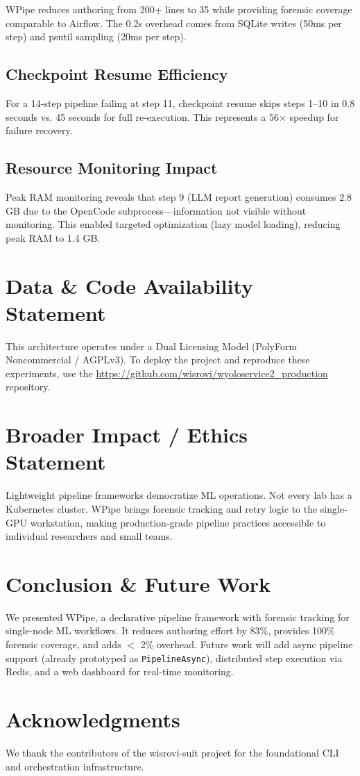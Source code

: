 \documentclass[10pt,twocolumn,letterpaper]{article}
\begin{document}
WPipe reduces authoring from 200+ lines to 35 while providing forensic coverage comparable to Airflow. The 0.2s overhead comes from SQLite writes (50ms per step) and psutil sampling (20ms per step).

\subsection{Checkpoint Resume Efficiency}
For a 14-step pipeline failing at step 11, checkpoint resume skips steps 1--10 in 0.8 seconds vs. 45 seconds for full re-execution. This represents a 56$\times$ speedup for failure recovery.

\subsection{Resource Monitoring Impact}
Peak RAM monitoring reveals that step 9 (LLM report generation) consumes 2.8 GB due to the OpenCode subprocess---information not visible without monitoring. This enabled targeted optimization (lazy model loading), reducing peak RAM to 1.4 GB.

\section{Data \& Code Availability Statement}
This architecture operates under a Dual Licensing Model (PolyForm Noncommercial / AGPLv3). To deploy the project and reproduce these experiments, use the \url{https://github.com/wisrovi/wyoloservice2\_production} repository.

\section{Broader Impact / Ethics Statement}
Lightweight pipeline frameworks democratize ML operations. Not every lab has a Kubernetes cluster. WPipe brings forensic tracking and retry logic to the single-GPU workstation, making production-grade pipeline practices accessible to individual researchers and small teams.

\section{Conclusion \& Future Work}
We presented WPipe, a declarative pipeline framework with forensic tracking for single-node ML workflows. It reduces authoring effort by 83\%, provides 100\% forensic coverage, and adds $<$ 2\% overhead. Future work will add async pipeline support (already prototyped as \texttt{PipelineAsync}), distributed step execution via Redis, and a web dashboard for real-time monitoring.

\section{Acknowledgments}
We thank the contributors of the wisrovi-suit project for the foundational CLI and orchestration infrastructure.



\end{document}
